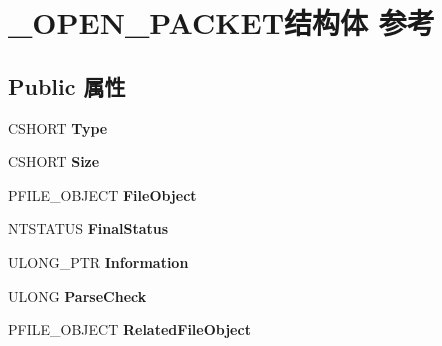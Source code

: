 \hypertarget{struct___o_p_e_n___p_a_c_k_e_t}{}\section{\+\_\+\+O\+P\+E\+N\+\_\+\+P\+A\+C\+K\+E\+T结构体 参考}
\label{struct___o_p_e_n___p_a_c_k_e_t}
\subsection*{Public 属性}
\begin{DoxyCompactItemize}
\item 
\mbox{\label{struct___o_p_e_n___p_a_c_k_e_t_a91067dd11c734139935efb8063bdb56e}} 
C\+S\+H\+O\+RT {\bfseries Type}
\item 
\mbox{\label{struct___o_p_e_n___p_a_c_k_e_t_ad82c1010937cdec0afcf49b9531c971c}} 
C\+S\+H\+O\+RT {\bfseries Size}
\item 
\mbox{\label{struct___o_p_e_n___p_a_c_k_e_t_ab1a070733300c3db548b401ee2c9868c}} 
P\+F\+I\+L\+E\+\_\+\+O\+B\+J\+E\+CT {\bfseries File\+Object}
\item 
\mbox{\label{struct___o_p_e_n___p_a_c_k_e_t_a77cd2859815af47b060634e613db46ec}} 
N\+T\+S\+T\+A\+T\+US {\bfseries Final\+Status}
\item 
\mbox{\label{struct___o_p_e_n___p_a_c_k_e_t_a9913a046699fc9255de1f8e317c25c10}} 
U\+L\+O\+N\+G\+\_\+\+P\+TR {\bfseries Information}
\item 
\mbox{\label{struct___o_p_e_n___p_a_c_k_e_t_ad68bb9c1ba30fe51e27033c0d6f324dd}} 
U\+L\+O\+NG {\bfseries Parse\+Check}
\item 
\mbox{\label{struct___o_p_e_n___p_a_c_k_e_t_ad2aedd06c34c673c3aabfd5db545d19d}} 
P\+F\+I\+L\+E\+\_\+\+O\+B\+J\+E\+CT {\bfseries Related\+File\+Object}
\item 
\mbox{\label{struct___o_p_e_n___p_a_c_k_e_t_a4a13e34d1172086385de8a42b9cb0cb5}} 

\end{DoxyCompactItemize}
